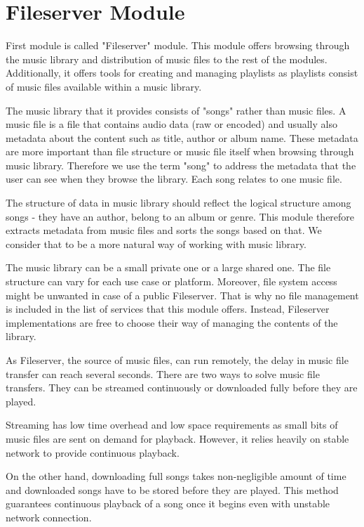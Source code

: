 \section{Fileserver Module}
First module is called "Fileserver" module. This module offers browsing through the music library and distribution of music files to the rest of the modules. Additionally, it offers tools for creating and managing playlists as playlists consist of music files available within a music library.
\par
The music library that it provides consists of "songs" rather than music files. A music file is a file that contains audio data (raw or encoded) and usually also metadata about the content such as title, author or album name. These metadata are more important than file structure or music file itself when browsing through music library. Therefore we use the term "song" to address the metadata that the user can see when they browse the library. Each song relates to one music file.
\par
The structure of data in music library should reflect the logical structure among songs - they have an author, belong to an album or genre. This module therefore extracts metadata from music files and sorts the songs based on that. We consider that to be a more natural way of working with music library.
\par
The music library can be a small private one or a large shared one. The file structure can vary for each use case or platform. Moreover, file system access might be unwanted in case of a public Fileserver. That is why no file management is included in the list of services that this module offers. Instead, Fileserver implementations are free to choose their way of managing the contents of the library.
\par
As Fileserver, the source of music files, can run remotely, the delay in music file transfer can reach several seconds. There are two ways to solve music file transfers. They can be streamed continuously or downloaded fully before they are played.
\par
Streaming has low time overhead and low space requirements as small bits of music files are sent on demand for playback. However, it relies heavily on stable network to provide continuous playback.
\par
On the other hand, downloading full songs takes non-negligible amount of time and downloaded songs have to be stored before they are played. This method guarantees continuous playback of a song once it begins even with unstable network connection.
